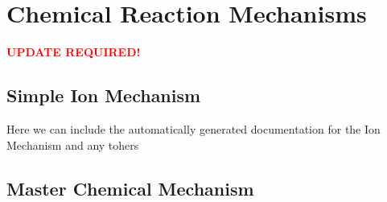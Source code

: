 \chapter{Chemical Reaction Mechanisms}

\textcolor{red}{\textbf{UPDATE REQUIRED!}}


\section{Simple Ion Mechanism}

Here we can include the automatically generated documentation for the Ion Mechanism and any tohers


\section{Master Chemical Mechanism}
